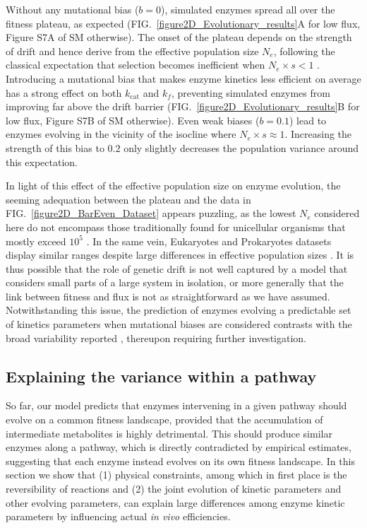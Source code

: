 \documentclass[11pt,onecolumn]{article}
\begin{document}
Without any mutational bias ($b=0$), simulated enzymes spread all over the fitness plateau, as expected (FIG.~\ref{figure2D_Evolutionary_results}A for low flux, Figure S7A of SM otherwise). The onset of the plateau depends on the strength of drift and hence derive from the effective population size $N_e$, following the classical expectation that selection becomes inefficient when $N_e \times s < 1$ \citep{Kimura68}. Introducing a mutational bias that makes enzyme kinetics less efficient on average has a strong effect on both $k_\text{cat}$ and $k_f$, preventing simulated enzymes from improving far above the drift barrier (FIG.~\ref{figure2D_Evolutionary_results}B for low flux, Figure S7B of SM otherwise).
Even weak biases ($b=0.1$) lead to enzymes evolving in the vicinity of the isocline where $N_e \times s \approx 1$. Increasing the strength of this bias to $0.2$ only slightly decreases the population variance around this expectation.

In light of this effect of the effective population size on enzyme evolution, the seeming adequation between the plateau and the data in FIG.~\ref{figure2D_BarEven_Dataset} appears puzzling, as the lowest $N_e$ considered here do not encompass those traditionally found for unicellular organisms that mostly exceed $10^5$ \citep{Bobay18}.
In the same vein, Eukaryotes and Prokaryotes datasets display similar ranges despite large differences in effective population sizes \citep{Bar-Even11}. It is thus possible that the role of genetic drift is not well captured by a model that considers small parts of a large system in isolation, or more generally that the link between fitness and flux is not as straightforward as we have assumed. Notwithstanding this issue, the prediction of enzymes evolving a predictable set of kinetics parameters when mutational biases are considered contrasts with the broad variability reported \citep{Davidi18}, thereupon requiring further investigation.

\subsection{Explaining the variance within a pathway}

So far, our model predicts that enzymes intervening in a given pathway should evolve on a common fitness landscape, provided that the accumulation of intermediate metabolites is highly detrimental. This should produce similar enzymes along a pathway, which is directly contradicted by empirical estimates, suggesting that each enzyme instead evolves on its own fitness landscape. In this section we show that (1) physical constraints, among which in first place is the reversibility of reactions and (2) the joint evolution of kinetic parameters and other evolving parameters, can explain large differences among enzyme kinetic parameters by influencing actual \textit{in vivo} efficiencies. %
\end{document}
